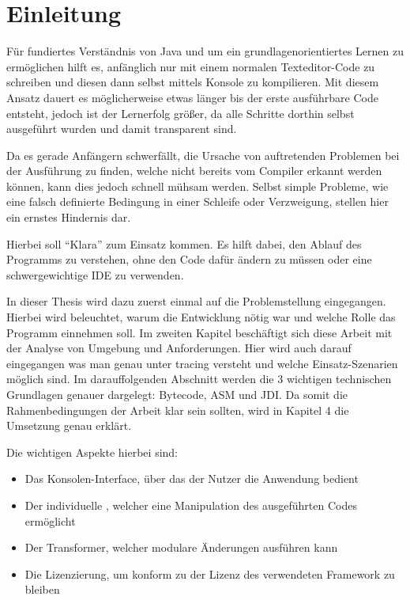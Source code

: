 
\chapter{Einleitung}

Für fundiertes Verständnis von Java und um ein grundlagenorientiertes Lernen zu ermöglichen hilft es, anfänglich nur mit einem normalen Texteditor-Code zu schreiben und diesen dann selbst mittels Konsole zu kompilieren.
Mit diesem Ansatz dauert es möglicherweise etwas länger bis der erste ausführbare Code entsteht, jedoch ist der Lernerfolg größer, da alle Schritte dorthin selbst ausgeführt wurden und damit transparent sind.

Da es gerade Anfängern schwerfällt, die Ursache von auftretenden Problemen bei der Ausführung zu finden, welche nicht bereits vom Compiler erkannt werden können, kann dies jedoch schnell mühsam werden. Selbst simple Probleme, wie eine falsch definierte Bedingung in einer Schleife oder Verzweigung, stellen hier ein ernstes Hindernis dar.

Hierbei soll "`Klara"' zum Einsatz kommen. Es hilft dabei, den Ablauf des Programms zu verstehen, ohne den Code dafür ändern zu müssen oder eine schwergewichtige \ac{IDE} zu verwenden.

In dieser Thesis wird dazu zuerst einmal auf die Problemstellung eingegangen. Hierbei wird beleuchtet, warum die Entwicklung nötig war und welche Rolle das Programm einnehmen soll.
Im zweiten Kapitel beschäftigt sich diese Arbeit mit der Analyse von Umgebung und Anforderungen. Hier wird auch darauf eingegangen was man genau unter tracing versteht und welche Einsatz-Szenarien möglich sind.
Im darauffolgenden Abschnitt werden die 3 wichtigen technischen Grundlagen genauer dargelegt: Bytecode, ASM und \ac{JDI}.
Da somit die Rahmenbedingungen der Arbeit klar sein sollten, wird in Kapitel 4 die Umsetzung genau erklärt.

Die wichtigen Aspekte hierbei sind:
\begin{itemize}
	\item Das Konsolen-Interface, über das der Nutzer die Anwendung bedient
	\item Der individuelle , welcher eine Manipulation des ausgeführten Codes ermöglicht
	\item Der Transformer, welcher modulare Änderungen ausführen kann
	\item Die Lizenzierung, um konform zu der Lizenz des verwendeten Framework zu bleiben
\end{itemize}

